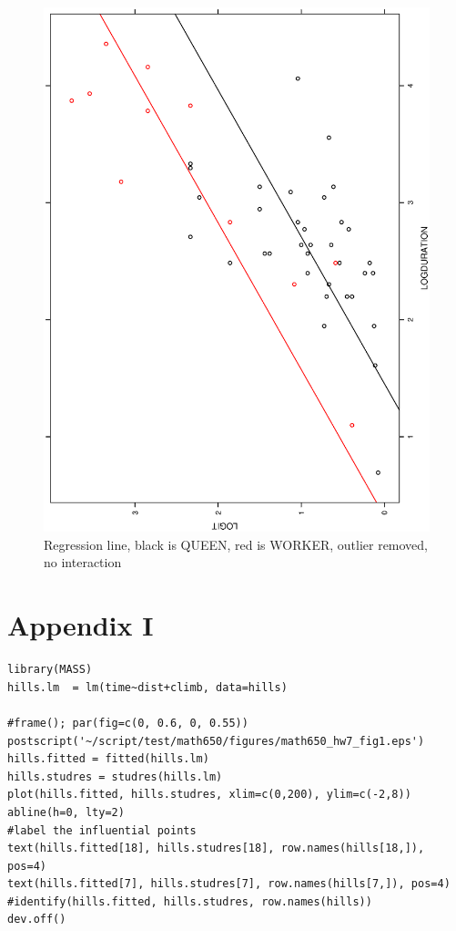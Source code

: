 \documentclass[a4paper,10pt]{article}
\begin{document}
\begin{figure}
\includegraphics[angle=-90, width=1\textwidth]{figures/math650_hw7_fig8.eps}
\caption{Regression line, black is QUEEN, red is WORKER, outlier removed, no interaction}\label{f8}
\end{figure}

\section{Appendix I}
\label{appendix1}
\begin{verbatim}
library(MASS)
hills.lm  = lm(time~dist+climb, data=hills)

#frame(); par(fig=c(0, 0.6, 0, 0.55))
postscript('~/script/test/math650/figures/math650_hw7_fig1.eps')
hills.fitted = fitted(hills.lm)
hills.studres = studres(hills.lm)
plot(hills.fitted, hills.studres, xlim=c(0,200), ylim=c(-2,8))
abline(h=0, lty=2)
#label the influential points
text(hills.fitted[18], hills.studres[18], row.names(hills[18,]), pos=4)
text(hills.fitted[7], hills.studres[7], row.names(hills[7,]), pos=4)
#identify(hills.fitted, hills.studres, row.names(hills))
dev.off()
\end{verbatim}
\end{document}
